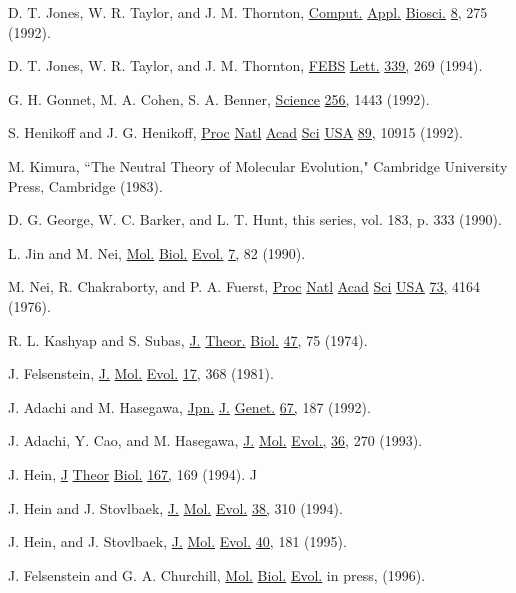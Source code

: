 \documentclass[12pt]{article}
\def\ul{\underline}
\begin{document}
\begin{enumerate}
\item D. T. Jones,  W. R. Taylor, and J. M. Thornton, \ul{Comput.} \ul{Appl.} \ul{Biosci.}  \ul{8,} 275 (1992).

\item D. T. Jones, W. R. Taylor, and J. M. Thornton, \ul{FEBS} \ul{Lett.}  \ul{339,}  269 (1994).

\item G. H. Gonnet, M. A. Cohen, S. A. Benner, \ul{Science}  \ul{256,} 1443 (1992).

\item S. Henikoff and J. G. Henikoff, \ul{Proc} \ul{Natl} \ul{Acad} \ul{Sci} \ul{USA} \ul{89,}  10915 (1992).

\item M. Kimura, ``The Neutral Theory of Molecular Evolution,"
Cambridge University Press, Cambridge (1983).

\item D. G. George,  W. C. Barker, and L. T. Hunt,  this series, vol. 183, p. 333 (1990).

\item L. Jin and M. Nei,  \ul{Mol.} \ul{Biol.} \ul{Evol.}  \ul{7,} 82 (1990).

\item M. Nei, R. Chakraborty, and P. A. Fuerst, \ul{Proc} \ul{Natl} \ul{Acad} \ul{Sci} \ul{USA}  \ul{73,}  4164 (1976).

\item R. L. Kashyap and S. Subas, \ul{J.} \ul{Theor.} \ul{Biol.} \ul{47,} 75 (1974).  

\item J. Felsenstein,  \ul{J.} \ul{Mol.} \ul{Evol.} \ul{17,} 368 (1981).
 
\item J. Adachi and M. Hasegawa, \ul{Jpn.} \ul{J.} \ul{Genet.} \ul{67,} 187 (1992).

\item{J. Adachi, Y. Cao, and M. Hasegawa, \ul{J.} \ul{Mol.} \ul{Evol.,} \ul{36,} 270 (1993).

\item J. Hein, \ul{J} \ul{Theor} \ul{Biol.}  \ul{167,}  169 (1994).
J
\item J. Hein and J. Stovlbaek, \ul{J.} \ul{Mol.} \ul{Evol.}  \ul{38,}  310 (1994).

\item J. Hein, and J. Stovlbaek, \ul{J.} \ul{Mol.} \ul{Evol.}  \ul{40,}  181 (1995).

\item J. Felsenstein and G. A. Churchill, \ul{Mol.} \ul{Biol.} \ul{Evol.} in press, (1996).

}
\end{enumerate}
\end{document}
